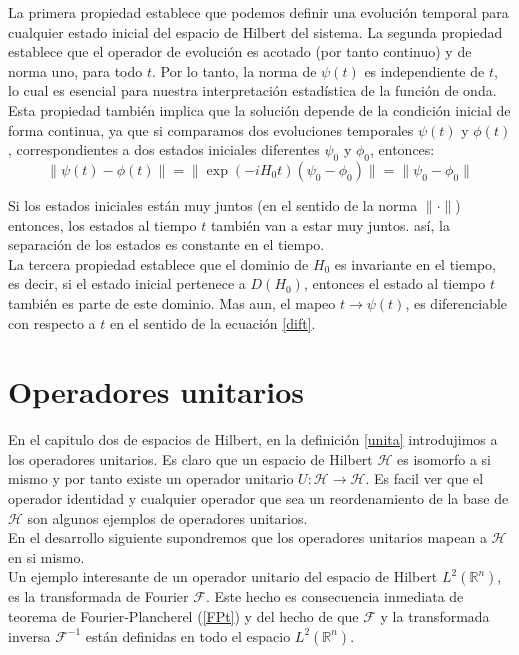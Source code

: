 \documentclass[12pt]{book}
\numberwithin{equation}{chapter}
\def\R{\mathbb{R}}
\def\rar{\rightarrow}
\def\H{\mathcal{H}}
\def\F{\mathcal{F}}
\begin{document}
La primera propiedad establece que podemos definir una evoluci\'on temporal para cualquier estado inicial del espacio de Hilbert del sistema. La segunda propiedad establece que el operador de evoluci\'on es acotado (por tanto continuo) y de norma uno, para todo $t$. Por lo tanto, la norma de $\psi (t)$ es independiente de $t$, lo cual es esencial para nuestra interpretaci\'on estad\'istica de la funci\'on de onda. Esta propiedad tambi\'en implica que la soluci\'on depende de la condici\'on inicial de forma continua, ya que si comparamos dos evoluciones temporales $\psi(t)$ y $\phi (t)$, correspondientes a dos estados iniciales diferentes $\psi_{0}$ y $\phi_{0}$, entonces:
$$ \| \psi(t) - \phi(t) \|= \| \exp(-iH_{0}t) (\psi_{0} -\phi_{0}) \| = \| \psi_{0} -\phi_{0} \| $$

Si los estados iniciales est\'an muy juntos (en el sentido de la norma $\| \cdot \|$) entonces, los estados al tiempo $t$ tambi\'en van a estar muy juntos. as\'i, la separaci\'on de los estados es constante en el tiempo.\\

La tercera propiedad establece que el dominio de $H_{0}$ es invariante en el tiempo, es decir, si el estado inicial pertenece a $D(H_{0})$, entonces el estado al tiempo $t$ tambi\'en es parte de este dominio. Mas aun, el mapeo $t \rar \psi(t)$, es diferenciable con respecto a $t$ en el sentido de la ecuaci\'on \eqref{dift}.\\


\section{Operadores unitarios}

En el capitulo dos de espacios de Hilbert, en la definici\'on \ref{unita} introdujimos a los operadores unitarios. Es claro que un espacio de Hilbert $\H$ es isomorfo a si mismo y por tanto existe un operador unitario $U: \H \rar \H$. Es facil ver que el operador identidad y cualquier operador que sea un reordenamiento de la base de $\H$ son algunos ejemplos de operadores unitarios.\\

En el desarrollo siguiente supondremos que los operadores unitarios mapean a $\H$ en si mismo.\\

Un ejemplo interesante de un operador unitario del espacio de Hilbert $L^{2}(\R^{n})$, es la transformada de Fourier $\F$. Este hecho es consecuencia inmediata de teorema de Fourier-Plancherel (\ref{FPt}) y del hecho de que $\F$ y la transformada inversa $\F^{-1}$ est\'an definidas en todo el espacio $L^{2}(\R^{n})$.\\
\end{document}
